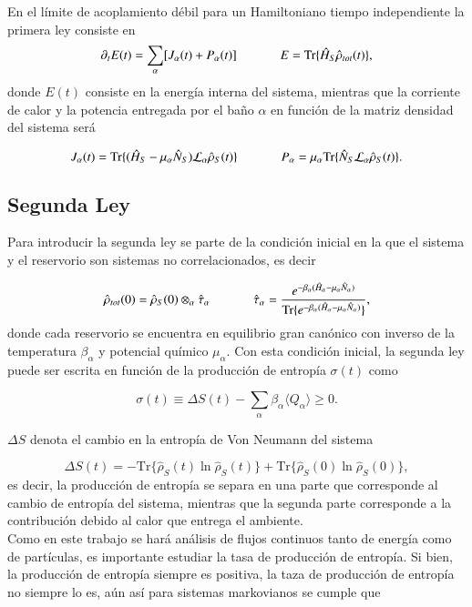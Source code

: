 En el límite de acoplamiento débil para un Hamiltoniano tiempo independiente la primera ley consiste en 
\begin{equation*}
    \partial_{t}E(t) = \sum_{\alpha}[J_{\alpha}(t) + P_{\alpha}(t) ] \hspace{12mm} E = \text{Tr}\{\hat{H}_{S}\hat{\rho}_{tot}(t) \},
\end{equation*}
donde $E(t)$ consiste en la energía interna del sistema, mientras que la corriente de calor y la potencia entregada por el baño $\alpha$ en función de la matriz densidad del sistema será 

\begin{equation*}
    J_{\alpha}(t) = \text{Tr}\{(\hat{H}_{S} - \mu_{\alpha}\hat{N}_S)\mathcal{L}_{\alpha}\hat{\rho}_{S}(t) \} \hspace{12mm} P_{\alpha} = \mu_{\alpha} \text{Tr}\{\hat{N}_{S}\mathcal{L}_{\alpha}\hat{\rho}_{S}(t) \}. 
\end{equation*}

\subsection{Segunda Ley}
Para introducir la segunda ley se parte de la condición inicial en la que el sistema y el reservorio son sistemas no correlacionados, es decir 

\begin{equation*}
    \hat{\rho}_{tot}(0) = \hat{\rho}_{S}(0)\otimes_{\alpha}\hat{\tau}_{\alpha} \hspace{12mm} \hat{\tau}_{\alpha} = \frac{e^{-\beta_{\alpha}(\hat{H}_{\alpha}-\mu_{\alpha}\hat{N}_{\alpha}) }}{ \text{Tr}\{e^{-\beta_{\alpha}(\hat{H}_{\alpha} - \mu_{\alpha}\hat{N}_{\alpha})}\} },
\end{equation*}
donde cada reservorio se encuentra en equilibrio gran canónico con inverso de la temperatura $\beta_{\alpha}$ y potencial químico $\mu_{\alpha}$. Con esta condición inicial, la segunda ley puede ser escrita en función de la producción de entropía $\sigma(t)$ como \cite{esposito2010entropy}

\begin{equation*}
    \sigma(t) \equiv \Delta S(t) - \sum_{\alpha}\beta_{\alpha}\langle Q_{\alpha}\rangle \geq 0.
\end{equation*}

$\Delta S$ denota el cambio en la entropía de Von Neumann del sistema

\begin{equation*}
    \Delta S(t) = -  \text{Tr}\{\hat{\rho}_{S}(t)\ln \hat{\rho}_{S}(t) \} +  \text{Tr}\{ \hat{\rho}_{S}(0)\ln \hat{\rho}_{S}(0) \},
\end{equation*}
es decir, la producción de entropía se separa en una parte que corresponde al cambio de entropía del sistema, mientras que la segunda parte corresponde a la contribución debido al calor que entrega el ambiente.\\
Como en este trabajo se hará análisis de flujos continuos tanto de energía como de partículas, es importante estudiar la tasa de producción de entropía. Si bien, la producción de entropía siempre es positiva, la taza de producción de entropía no siempre lo es, aún así para sistemas markovianos se cumple que \cite{strasberg2019non}

